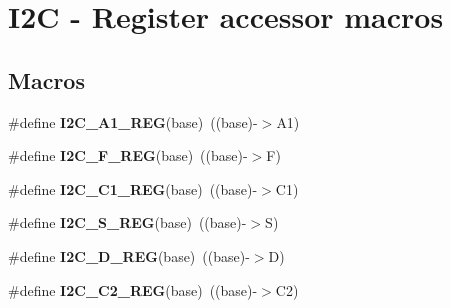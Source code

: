\hypertarget{group__I2C__Register__Accessor__Macros}{}\section{I2C -\/ Register accessor macros}
\label{group__I2C__Register__Accessor__Macros}
\subsection*{Macros}
\begin{DoxyCompactItemize}
\item 
\#define {\bfseries I2\+C\+\_\+\+A1\+\_\+\+R\+EG}(base)~((base)-\/$>$A1)\hypertarget{group__I2C__Register__Accessor__Macros_gaa114fe991a3e1e899b53160c91bd8c72}{}\label{group__I2C__Register__Accessor__Macros_gaa114fe991a3e1e899b53160c91bd8c72}

\item 
\#define {\bfseries I2\+C\+\_\+\+F\+\_\+\+R\+EG}(base)~((base)-\/$>$F)\hypertarget{group__I2C__Register__Accessor__Macros_ga49a7294fe984b9468681113184d18dfc}{}\label{group__I2C__Register__Accessor__Macros_ga49a7294fe984b9468681113184d18dfc}

\item 
\#define {\bfseries I2\+C\+\_\+\+C1\+\_\+\+R\+EG}(base)~((base)-\/$>$C1)\hypertarget{group__I2C__Register__Accessor__Macros_gab99b9e99fa2eda1aac30eff81842ce36}{}\label{group__I2C__Register__Accessor__Macros_gab99b9e99fa2eda1aac30eff81842ce36}

\item 
\#define {\bfseries I2\+C\+\_\+\+S\+\_\+\+R\+EG}(base)~((base)-\/$>$S)\hypertarget{group__I2C__Register__Accessor__Macros_gaba7d61b90ba883e4e9711a54e4526465}{}\label{group__I2C__Register__Accessor__Macros_gaba7d61b90ba883e4e9711a54e4526465}

\item 
\#define {\bfseries I2\+C\+\_\+\+D\+\_\+\+R\+EG}(base)~((base)-\/$>$D)\hypertarget{group__I2C__Register__Accessor__Macros_ga0c6f62e67b1d2b8bc2eb7ed0e3a57fbd}{}\label{group__I2C__Register__Accessor__Macros_ga0c6f62e67b1d2b8bc2eb7ed0e3a57fbd}

\item 
\#define {\bfseries I2\+C\+\_\+\+C2\+\_\+\+R\+EG}(base)~((base)-\/$>$C2)\hypertarget{group__I2C__Register__Accessor__Macros_ga27c7ad30a1ae595f33d8644b381be049}{}\label{group__I2C__Register__Accessor__Macros_ga27c7ad30a1ae595f33d8644b381be049}


\end{DoxyCompactItemize}
